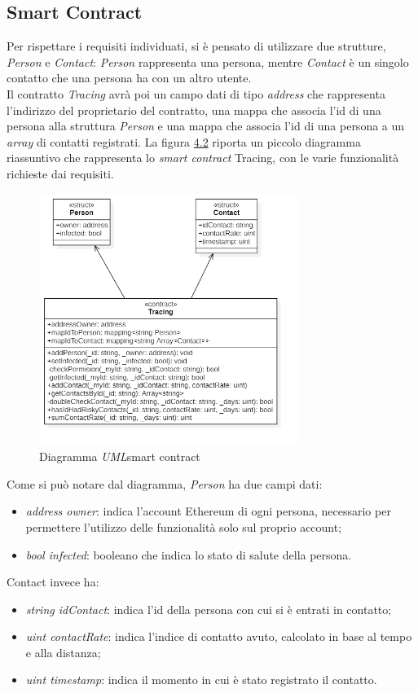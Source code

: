 \subsection{Smart Contract}
Per rispettare i requisiti individuati, si è pensato di utilizzare due strutture, \textit{Person} e \textit{Contact}: \textit{Person} rappresenta una persona, mentre \textit{Contact} è un singolo contatto che una persona ha con un altro utente.\\ Il contratto \textit{Tracing} avrà poi un campo dati di tipo \textit{address} che rappresenta l'indirizzo del proprietario del contratto, una mappa che associa l'id di una persona alla struttura \textit{Person} e una mappa che associa l'id di una persona a un \textit{array} di contatti registrati.
La figura \hyperref[fig:umlcontract]{4.2} riporta un piccolo diagramma riassuntivo che rappresenta lo \textit{smart contract} Tracing, con le varie funzionalità richieste dai requisiti.
\begin{figure}[h]
\label{fig:umlcontract}
\caption{Diagramma \emph{\gls{UML}}\glsfirstoccur smart contract}
\centering
\includegraphics[width=0.75\textwidth]{./immagini/tracingcontractuml}
\end{figure}
\FloatBarrier

Come si può notare dal diagramma, \textit{Person} ha due campi dati:
\begin{itemize}
	\item{\textit{address owner}: indica l'account Ethereum di ogni persona, necessario per permettere l'utilizzo delle funzionalità solo sul proprio account;}
	\item{\textit{bool infected}: booleano che indica lo stato di salute della persona.}
\end{itemize}
Contact invece ha:
\begin{itemize}
	\item{\textit{string idContact}: indica l'id della persona con cui si è entrati in contatto;}
	\item{\textit{uint contactRate}: indica l'indice di contatto avuto, calcolato in base al tempo e alla distanza;}
	\item{\textit{uint timestamp}: indica il momento in cui è stato registrato il contatto.}
\end{itemize}

